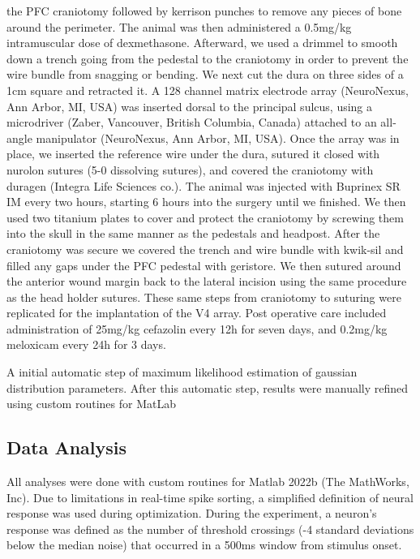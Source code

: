 the PFC craniotomy followed by kerrison punches to remove any pieces of bone around the perimeter. The animal was then administered a 0.5mg/kg intramuscular dose of dexmethasone. Afterward, we used a drimmel to smooth down a trench going from the pedestal to the craniotomy in order to prevent the wire bundle from snagging or bending. We next cut the dura on three sides of a 1cm square and retracted it. A 128 channel matrix electrode array (NeuroNexus, Ann Arbor, MI, USA) was inserted dorsal to the principal sulcus, using a microdriver (Zaber, Vancouver, British Columbia, Canada) attached to an all-angle manipulator (NeuroNexus, Ann Arbor, MI, USA). Once the array was in place, we inserted the reference wire under the dura, sutured it closed with nurolon sutures (5-0 dissolving sutures), and covered the craniotomy with duragen (Integra Life Sciences co.). The animal was injected with Buprinex SR IM every two hours, starting 6 hours into the surgery until we finished. We then used two titanium plates to cover and protect the craniotomy by screwing them into the skull in the same manner as the pedestals and headpost. After the craniotomy was secure we covered the trench and wire bundle with kwik-sil and filled any gaps under the PFC pedestal with geristore. We then sutured around the anterior wound margin back to the lateral incision using the same procedure as the head holder sutures. These same steps from craniotomy to suturing were replicated for the implantation of the V4 array. Post operative care included administration of 25mg/kg cefazolin every 12h for seven days, and 0.2mg/kg meloxicam every 24h for 3 days.

A initial automatic step of maximum likelihood estimation of gaussian distribution parameters. After this automatic step, results were manually refined using custom routines for MatLab \parencite{Kelly2007}


\subsection{Data Analysis}
All analyses were done with custom routines for Matlab 2022b (The MathWorks, Inc). Due to limitations in real-time spike sorting, a simplified definition of neural response was used during optimization. During the experiment, a neuron's response was defined as the number of threshold crossings (-4 standard deviations below the median noise) that occurred in a 500ms window from stimulus onset. 



